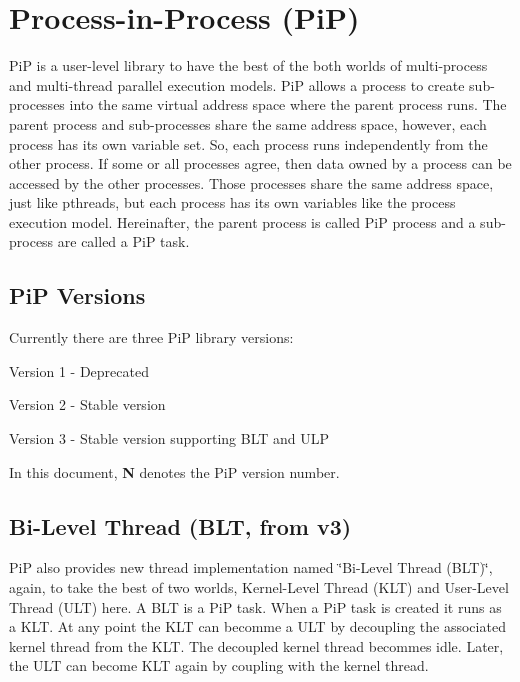 \section*{Process-\/in-\/\-Process (Pi\-P)}

Pi\-P is a user-\/level library to have the best of the both worlds of multi-\/process and multi-\/thread parallel execution models. Pi\-P allows a process to create sub-\/processes into the same virtual address space where the parent process runs. The parent process and sub-\/processes share the same address space, however, each process has its own variable set. So, each process runs independently from the other process. If some or all processes agree, then data owned by a process can be accessed by the other processes. Those processes share the same address space, just like pthreads, but each process has its own variables like the process execution model. Hereinafter, the parent process is called Pi\-P process and a sub-\/process are called a Pi\-P task.

\subsection*{Pi\-P Versions}

Currently there are three Pi\-P library versions\-:


\begin{DoxyItemize}
\item Version 1 -\/ Deprecated
\item Version 2 -\/ Stable version
\item Version 3 -\/ Stable version supporting B\-L\-T and U\-L\-P
\end{DoxyItemize}

In this document, {\bfseries N} denotes the Pi\-P version number.

\subsection*{Bi-\/\-Level Thread (B\-L\-T, from v3)}

Pi\-P also provides new thread implementation named \char`\"{}\-Bi-\/\-Level Thread
(\-B\-L\-T)\char`\"{}, again, to take the best of two worlds, Kernel-\/\-Level Thread (K\-L\-T) and User-\/\-Level Thread (U\-L\-T) here. A B\-L\-T is a Pi\-P task. When a Pi\-P task is created it runs as a K\-L\-T. At any point the K\-L\-T can becomme a U\-L\-T by decoupling the associated kernel thread from the K\-L\-T. The decoupled kernel thread becommes idle. Later, the U\-L\-T can become K\-L\-T again by coupling with the kernel thread.


